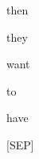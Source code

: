 \documentclass[varwidth=150mm]{standalone}
\begin{document}
\begin{CJK*}{UTF8}{gbsn}
{{{\colorbox{red!2.7438712120056152}{\strut then} \colorbox{red!3.0404019355773926}{\strut they} \colorbox{red!1.1772512197494507}{\strut want} \colorbox{red!3.2760183811187744}{\strut to} \colorbox{red!2.9757282733917236}{\strut have} \colorbox{red!11.087503433227539}{\strut [SEP]}
}}}
\end{CJK*}
\end{document}
